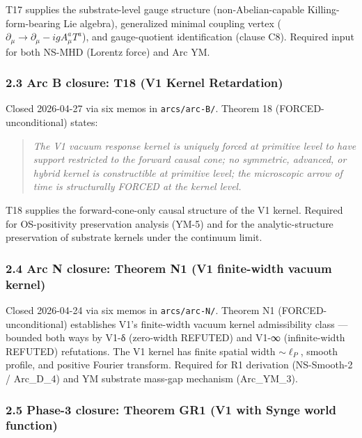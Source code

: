 \documentclass[
  11pt,a4paper]{article}
\begin{document}
T17 supplies the substrate-level gauge structure (non-Abelian-capable
Killing-form-bearing Lie algebra), generalized minimal coupling vertex
(\(\partial_\mu \to \partial_\mu - igA_\mu^a T^a\)), and gauge-quotient
identification (clause C8). Required input for both NS-MHD (Lorentz
force) and Arc YM.

\subsubsection{2.3 Arc B closure: T18 (V1 Kernel
Retardation)}\label{arc-b-closure-t18-v1-kernel-retardation}

Closed 2026-04-27 via six memos in \texttt{arcs/arc-B/}. Theorem 18
(FORCED-unconditional) states:

\begin{quote}
\emph{The V1 vacuum response kernel is uniquely forced at primitive
level to have support restricted to the forward causal cone; no
symmetric, advanced, or hybrid kernel is constructible at primitive
level; the microscopic arrow of time is structurally FORCED at the
kernel level.}
\end{quote}

T18 supplies the forward-cone-only causal structure of the V1 kernel.
Required for OS-positivity preservation analysis (YM-5) and for the
analytic-structure preservation of substrate kernels under the continuum
limit.

\subsubsection{2.4 Arc N closure: Theorem N1 (V1 finite-width vacuum
kernel)}\label{arc-n-closure-theorem-n1-v1-finite-width-vacuum-kernel}

Closed 2026-04-24 via six memos in \texttt{arcs/arc-N/}. Theorem N1
(FORCED-unconditional) establishes V1's finite-width vacuum kernel
admissibility class --- bounded both ways by V1-δ (zero-width REFUTED)
and V1-∞ (infinite-width REFUTED) refutations. The V1 kernel has finite
spatial width \(\sim\ell_P\), smooth profile, and positive Fourier
transform. Required for R1 derivation (NS-Smooth-2 / Arc\_D\_4) and YM
substrate mass-gap mechanism (Arc\_YM\_3).

\subsubsection{2.5 Phase-3 closure: Theorem GR1 (V1 with Synge world
function)}\label{phase-3-closure-theorem-gr1-v1-with-synge-world-function}
\end{document}
